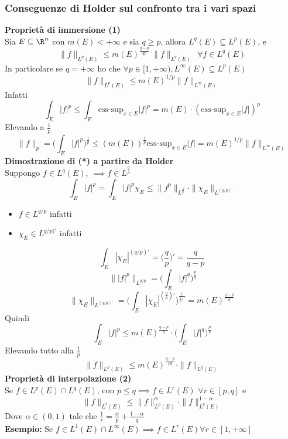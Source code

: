 \subsubsection{Conseguenze di Holder sul confronto tra i vari spazi}
\textbf{Proprietà di immersione (1)}\\ 
Sia $E\subseteq \R^n$ con $m(E)<+\infty$ e sia $q\ge p$, allora $L^q(E)\subseteq L^p(E)$, e 
\[\|f\|_{L^p(E)}\le m(E)^{\frac{q-p}{qp}}\ \|f\|_{L^q(E)}\ \ \forall f\in L^q(E)\]
In particolare se $q=+\infty$ ho che $\forall p\in[1,+\infty),L^\infty(E)\subseteq L^p(E)$
\[\|f\|_{L^p(E)}\le m(E)^{1 / p}\|f\|_{L^\infty(E)}\]
Infatti
\[\int_{E}^{} |f|^p\le \int_{E}^{} \text{ess-sup}_{x\in E}|f|^p=m(E)\cdot (\text{ess-sup}_{x\in E}|f|)^p\]
Elevando a $\frac{1}{p}$
\[\|f\|_p=\bigg(\int_{E}{|f|^p\bigg)^{\frac{1}{p}}}\le (m(E))^{\frac{1}{p}}\text{ess-sup}_{x\in E}|f|=m(E)^{1 / p}\|f\|_{L^\infty(E)}  \]
\textbf{Dimostrazione di (*) a partire da Holder}\\
Suppongo $f\in L^q(E)$, $\implies f\in L^{\frac{q}{p}}$
\[\int_{E}^{} |f|^p=\int_{E}^{} |f|^p\chi_E \le \|f^p\|_{L^{\frac{q}{p}}}\cdot \|\chi_E\|_{L^{(q / p)'}}\]
\begin{itemize}
	\item $f\in L^{q / p}$ infatti 
	\item $\chi_E\in L^{q / p )'}$ infatti
\end{itemize}
\[\int_{E}^{} |\chi_E|^{(q / p)'}=\bigg(\frac{q}{p}\bigg)'=\frac{q}{q-p}\]
\[\ \| |f|^p\|_{L^{q / p}}=\bigg(\int_{E}^{} |f|^q\bigg)^{\frac{p}{q}}\]
\[\|\chi_E\|_{L^{(q / p)'}}=\bigg( \int_{E}^{} |\chi_E|^{(\frac{q}{p})'}\bigg)^{\frac{1}{\frac{q}{p})'}}=m(E)^{\frac{q-p}{q}}\]
Quindi
\[\int_{E}^{} |f|^p\le m(E)^{\frac{q-p}{q}}\cdot \bigg(\int_{E}^{} |f|^q\bigg)^{\frac{p}{q}}\]
Elevando tutto alla $\frac{1}{p}$ 
\[\|f\|_{L^p(E)}\le m(E)^{\frac{q-p}{pq}}\cdot \|f\|_{L^{q}(E)}\]
\textbf{Proprietà di interpolazione (2)}\\
Se $f\in L^p(E)\cap L^q(E)$, con $p\le q\implies f\in L^r(E)$ $\forall  r\in [p,q]$ e
\[\|f\|_{L^r(E)}\le \|f\|_{L^p(E)}^\alpha\cdot \|f\|_{L^{q}(E)}^{1-\alpha}\]
Dove $\alpha\in (0,1)$ tale che $\frac{1}{r}=\frac{\alpha}{p}+\frac{1-\alpha}{q}$\\ 
\textbf{Esempio:} Se $f\in L^{1}(E)\cap L^{\infty}(E)\implies f\in L^{r}(E)\forall r\in [1,+\infty]$
